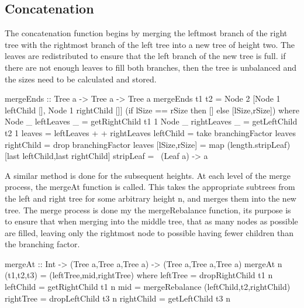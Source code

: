 \documentclass[11pt,a4paper,oneside]{article}
\begin{document}
\subsection*{Concatenation}

The concatenation function begins by merging the leftmost branch of the right tree with the rightmost branch of the left tree into a new tree of height two. The leaves are redistributed to ensure that the left branch of the new tree is full. if there are not enough leaves to fill both branches, then the tree is unbalanced and the sizes need to be calculated and stored.

\begin{haskell}

mergeEnds :: Tree a -> Tree a -> Tree a
mergeEnds t1 t2 = Node 2 [Node 1 leftChild [], Node 1 rightChild []] (if lSize == rSize then [] else [lSize,rSize])
        where Node _ leftLeaves _  = getRightChild t1 1
              Node _ rightLeaves _ = getLeftChild t2 1
              leaves        = leftLeaves + + rightLeaves
              leftChild     = take branchingFactor leaves
              rightChild    = drop branchingFactor leaves
              [lSize,rSize] = map (length.stripLeaf) [last leftChild,last rightChild]
              stripLeaf     = \ (Leaf a) -> a

\end{haskell}

A similar method is done for the subsequent heights. At each level of the merge process, the mergeAt function is called. This takes the appropriate subtrees from the left and right tree for some arbitrary height n, and merges them into the new tree. The merge process is done my the mergeRebalance function, its purpose is to ensure that when merging into the middle tree, that as many nodes as possible are filled, leaving only the rightmost node to possible having fewer children than the branching factor.

\begin{haskell}

mergeAt :: Int -> (Tree a,Tree a,Tree a) -> (Tree a,Tree a,Tree a)
mergeAt n (t1,t2,t3) = (leftTree,mid,rightTree)
                where leftTree   = dropRightChild t1 n
                      leftChild  = getRightChild t1 n
                      mid        = mergeRebalance (leftChild,t2,rightChild)
                      rightTree  = dropLeftChild t3 n
                      rightChild = getLeftChild t3 n

\end{haskell}
\end{document}
